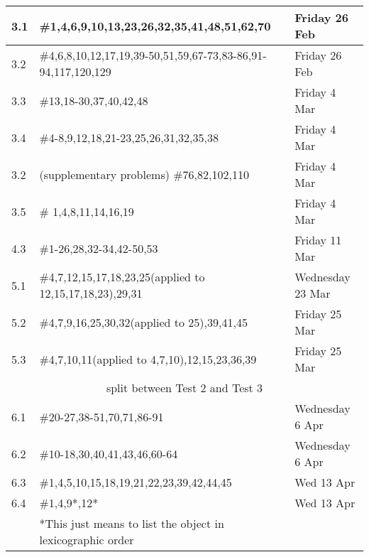 \documentclass[11pt]{article}
\begin{document}
\begin{tabular}{|p{1.6cm}|p{12cm}|p{3cm}|}
\hline
3.1&\#1,4,6,9,10,13,23,26,32,35,41,48,51,62,70& Friday 26 Feb\\
\hline
3.2&\#4,6,8,10,12,17,19,39-50,51,59,67-73,83-86,91-94,117,120,129&Friday 26 Feb\\
\hline
3.3&\#13,18-30,37,40,42,48&Friday 4 Mar\\
\hline
3.4&\#4-8,9,12,18,21-23,25,26,31,32,35,38&Friday 4 Mar\\
\hline
3.2&(supplementary problems) \#76,82,102,110&Friday 4 Mar\\
\hline
3.5&\# 1,4,8,11,14,16,19& Friday 4 Mar\\
\hline
4.3& \#1-26,28,32-34,42-50,53& Friday 11 Mar\\
\hline
5.1&\#4,7,12,15,17,18,23,25(applied to 12,15,17,18,23),29,31& Wednesday 23 Mar\\
\hline
5.2&\#4,7,9,16,25,30,32(applied to 25),39,41,45&Friday 25 Mar\\
\hline
5.3&\#4,7,10,11(applied to 4,7,10),12,15,23,36,39&Friday 25 Mar\\
\hline
\hline
\multicolumn{3}{c}{split between Test 2 and Test 3}\\
\hline
6.1&\#20-27,38-51,70,71,86-91&Wednesday 6 Apr\\
\hline
6.2& \#10-18,30,40,41,43,46,60-64& Wednesday 6 Apr\\
\hline
6.3&\#1,4,5,10,15,18,19,21,22,23,39,42,44,45& Wed 13 Apr\\
\hline
6.4&\#1,4,9*,12*&Wed 13 Apr\\
&*This just means to list the object in lexicographic order& \\
\hline
\end{tabular}
\end{document}
